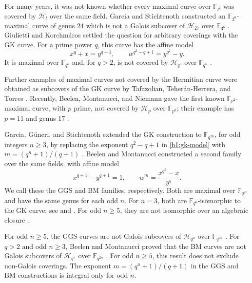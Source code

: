 \documentclass[12pt,reqno]{amsart}
\numberwithin{equation}{section}
\newcommand{\F}{\mathbb F}
\theoremstyle{plain}
\theoremstyle{definition}
\theoremstyle{remark}
\begin{document}
For many years, it was not known whether every maximal curve over
\(\F_{l^2}\) was covered by \(\mathcal H_l\) over the same field.
Garcia and Stichtenoth constructed an \(\F_{3^6}\)-maximal curve
of genus \(24\) which is not a Galois subcover of \(\mathcal H_{27}\)
over \(\F_{3^6}\) \cite{GS2006}.
Giulietti and Korchm\'aros settled the question for arbitrary coverings
with the GK curve.
For a prime power \(q\), this curve has the affine model
\cite[Remark~2.1]{GGS2010}
\begin{equation}
\label{b1:gk-model}
 x^q+x=y^{q+1},\qquad w^{q^2-q+1}=y^{q^2}-y.
\end{equation}
It is maximal over \(\F_{q^6}\) and, for \(q>2\), is not
covered by \(\mathcal H_{q^3}\) over \(\F_{q^6}\)
\cite[Theorems~1 and~5]{GK2009}.

Further examples of maximal curves not covered by the Hermitian
curve were obtained as subcovers of the GK curve by Tafazolian,
Teher\'an-Herrera, and Torres \cite{TTT2016}.
Recently, Beelen, Montanucci, and Niemann gave the first known
\(\F_{p^2}\)-maximal curve, with \(p\) prime, not covered by
\(\mathcal H_p\) over \(\F_{p^2}\); their example has \(p=11\)
and genus \(17\)
\cite[Theorems~2.3 and~3.1]{BMN2026}.

Garcia, G\"uneri, and Stichtenoth extended the GK construction to
\(\F_{q^{2n}}\), for odd integers \(n\ge3\), by replacing the
exponent \(q^2-q+1\) in \eqref{b1:gk-model} with
\(m=(q^n+1)/(q+1)\) \cite[equation~(2.1)]{GGS2010}.
Beelen and Montanucci constructed a second family over the same
fields, with affine model \cite[equation~(2.1)]{BM2018}
\begin{equation}
\label{b1:bm-model}
 x^{q+1}-y^{q+1}=1,\qquad w^m=\frac{x^{q^2}-x}{y^q}.
\end{equation}
We call these the GGS and BM families, respectively. Both are
maximal over \(\F_{q^{2n}}\) and have the same genus for each odd
\(n\). For \(n=3\), both are \(\F_{q^6}\)-isomorphic to the
GK curve; see \cite[Remark~2.1]{GGS2010} and
\cite[Section~2]{BM2018}.
For odd \(n\ge5\), they are not isomorphic over an algebraic closure
\cite[Corollary~2.6 and Remark~4.5]{BM2018}.

For odd \(n\ge5\), the GGS curves are not Galois subcovers of
\(\mathcal H_{q^n}\) over \(\F_{q^{2n}}\)
\cite{DM2012,GMZ2016}.
For \(q>2\) and odd \(n\ge3\), Beelen and Montanucci proved that the BM curves are
not Galois subcovers of
\(\mathcal H_{q^n}\) over \(\F_{q^{2n}}\)
\cite[Corollary~2.2]{BM2018}.
For odd \(n\ge5\), this result does not exclude non-Galois coverings.
The exponent \(m=(q^n+1)/(q+1)\) in the GGS and BM
constructions is integral only for odd \(n\).
\end{document}
